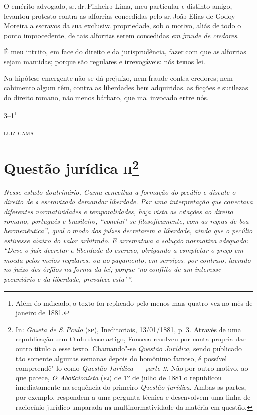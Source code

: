 O emérito advogado, sr.\,dr.\,Pinheiro Lima, meu particular e distinto
amigo, levantou protesto contra as alforrias concedidas pelo sr.\,João
Elias de Godoy Moreira a escravos da sua exclusiva propriedade, sob o
motivo, aliás de todo o ponto improcedente, de tais alforrias serem
concedidas \emph{em} \emph{fraude de credores}.

É meu intuito, em face do direito e da jurisprudência, fazer com que as
alforrias sejam mantidas; porque são regulares e irrevogáveis: nós temos
lei.

Na hipótese emergente não se dá prejuízo, nem fraude contra credores;
nem cabimento algum têm, contra as liberdades bem adquiridas, as ficções
e sutilezas do direito romano, não menos bárbaro, que mal invocado entre
nós.

\smallskip

\noindent{}3--1\footnote{Além do indicado, o texto foi replicado pelo menos mais
  quatro vez no mês de janeiro de 1881.}

\hfill\textsc{luiz gama}

\chapter{Questão jurídica \textsc{ii}\footnote[*]{In: \emph{Gazeta de S.\,Paulo} (\textsc{sp}), Ineditoriais,
  13/01/1881, p. 3. Através de uma republicação sem título desse artigo,
  Fonseca resolveu por conta própria dar outro título a esse texto.
  Chamando"-se \emph{Questão Jurídica}, sendo
  publicado tão somente algumas semanas depois do homônimo famoso, é possível
  compreendê"-lo como \emph{Questão Jurídica --- parte \textsc{ii}}. Não por
  outro motivo, ao que parece, \emph{O Abolicionista} (\textsc{rj}) de 1º de
  julho de 1881 o republicou imediatamente na sequência do primeiro
  \emph{Questão jurídica}. Ambas as partes, por exemplo, respondem a uma
  pergunta técnica e desenvolvem uma linha de raciocínio jurídico
  amparada na multinormatividade da matéria em questão.}}

\begin{flushleft}
{\footnotesize\itshape
Nesse estudo doutrinário, Gama conceitua a
formação do pecúlio e discute o direito de o escravizado demandar
liberdade. Por uma interpretação que conectava diferentes normatividades
e temporalidades, haja vista as citações ao direito romano, português e
brasileiro, ``conclui"-se filosoficamente, com as regras de boa
hermenêutica'', qual o modo dos juízes decretarem a
liberdade, ainda que o pecúlio estivesse abaixo do valor arbitrado. E
arrematava a solução normativa adequada: ``Deve o juiz decretar a
liberdade do escravo, obrigando a completar o preço em moeda pelos meios
regulares, ou ao pagamento, em serviços, por contrato, lavrado no juízo
dos órfãos na forma da lei; porque `no conflito de um interesse
pecuniário e da liberdade, prevalece esta'\,''. }
\end{flushleft}

